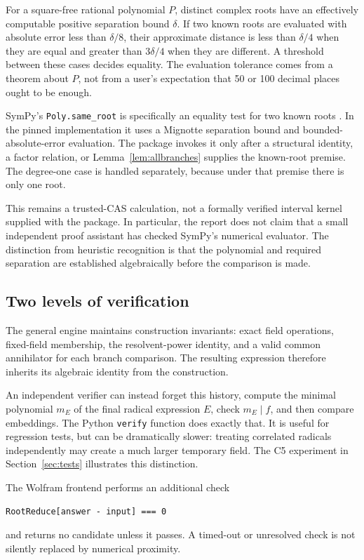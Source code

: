 \documentclass[11pt]{article}
\theoremstyle{definition}\newtheorem{definition}[theorem]{Definition}
\theoremstyle{remark}\newtheorem{remark}[theorem]{Remark}
\newcommand{\code}[1]{\texttt{#1}}
\begin{document}
For a square-free rational polynomial $P$, distinct complex roots have an
effectively computable positive separation bound $\delta$. If two known roots
are evaluated with absolute error less than $\delta/8$, their approximate
distance is less than $\delta/4$ when they are equal and greater than
$3\delta/4$ when they are different. A threshold between these cases decides
equality. The evaluation tolerance comes from a theorem about $P$, not from a
user's expectation that 50 or 100 decimal places ought to be enough.

SymPy's \code{Poly.same\_root} is specifically an equality test for two known
roots \cite{sympy-poly}. In the pinned implementation it uses a Mignotte
separation bound and bounded-absolute-error evaluation. The package invokes it
only after a structural identity, a factor relation, or
Lemma~\ref{lem:allbranches} supplies the known-root premise. The degree-one
case is handled separately, because under that premise there is only one root.

This remains a trusted-CAS calculation, not a formally verified interval kernel
supplied with the package. In particular, the report does not claim that a
small independent proof assistant has checked SymPy's numerical evaluator.
The distinction from heuristic recognition is that the polynomial and required
separation are established algebraically before the comparison is made.

\subsection{Two levels of verification}

The general engine maintains construction invariants: exact field operations,
fixed-field membership, the resolvent-power identity, and a valid common
annihilator for each branch comparison. The resulting expression therefore
inherits its algebraic identity from the construction.

An independent verifier can instead forget this history, compute the minimal
polynomial $m_E$ of the final radical expression $E$, check $m_E\mid f$, and
then compare embeddings. The Python \code{verify} function does exactly that.
It is useful for regression tests, but can be dramatically slower: treating
correlated radicals independently may create a much larger temporary field.
The C5 experiment in Section~\ref{sec:tests} illustrates this distinction.

The Wolfram frontend performs an additional check
\begin{lstlisting}
RootReduce[answer - input] === 0
\end{lstlisting}
and returns no candidate unless it passes. A timed-out or unresolved check is
not silently replaced by numerical proximity.
\end{document}
